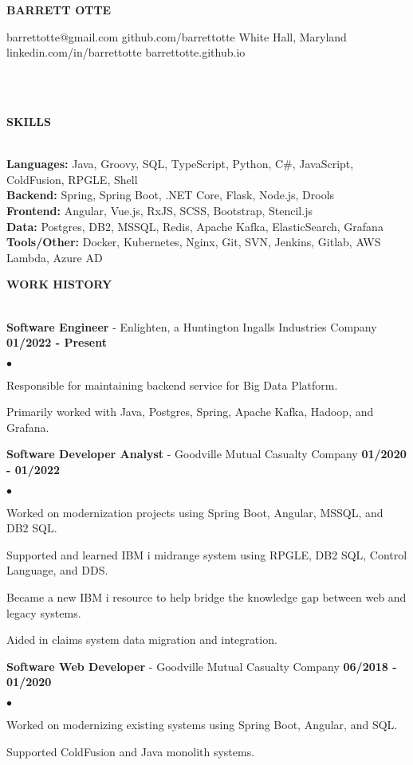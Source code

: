 \documentclass{article}
\newcommand{\lineunder}{
	\vspace*{-4pt}\\ 
	\hspace*{-18pt}\hrulefill \\
}
\newcommand{\header}[1]{
	{\hspace*{-15pt}\vspace*{6pt}\textsc{#1}}\vspace*{-6pt}\lineunder
}
\newcommand{\employer}[3]{
	\textbf{#1} - #2 \vspace*{2pt} \hfill \textbf{#3} \vspace*{2pt}
}
\newcommand{\contact}[6]{
	\begin{center}
		{\Large \textbf \scshape \bfseries{#1}}
	\end{center}
	\small{#2} \hfill \small{#3} \break
	\small{#4} \hfill \small{#5} \break
	\hspace*{20pt} \hfill \small {#6} \break
	\vspace*{-6pt}
	\lineunder
	\vspace*{-6pt}
}
\newenvironment{resumelist}{
	\vspace*{2pt}
	\begin{list}
		{\small$\bullet$}{\topsep 0pt \itemsep -2pt}}{\vspace*{4pt}
	\end{list}
}
\newcommand{\resumeheader}[1]{
	\vspace*{10pt}
	\header{\textbf{#1}}
    \vspace*{3pt}
}
\begin{document}
	\normalsize
	\smallskip
	\vspace*{-44pt}

	\contact
		{BARRETT OTTE}
		{barrettotte@gmail.com}
		{github.com/barrettotte}
		{White Hall, Maryland}
		{linkedin.com/in/barrettotte}
		{barrettotte.github.io}

	\resumeheader{SKILLS}
		\textbf{Languages:}
			Java, Groovy, SQL, TypeScript, Python, C\#, JavaScript, ColdFusion, RPGLE, Shell\\
			\vspace*{5pt}
        \textbf{Backend:}
			Spring, Spring Boot, .NET Core, Flask, Node.js, Drools\\
			\vspace*{5pt}
		\textbf{Frontend:}
			Angular, Vue.js, RxJS, SCSS, Bootstrap, Stencil.js\\
			\vspace*{5pt}
        \textbf{Data:}
			Postgres, DB2, MSSQL, Redis, Apache Kafka, ElasticSearch, Grafana\\
			\vspace*{5pt}
		\textbf{Tools/Other:}
			Docker, Kubernetes, Nginx, Git, SVN, Jenkins, Gitlab, AWS Lambda, Azure AD\\
			\vspace*{5pt}

	\resumeheader{WORK HISTORY}
		\employer
			{Software Engineer}{Enlighten, a Huntington Ingalls Industries Company}{01/2022 - Present}
			\begin{resumelist}
				\item Responsible for maintaining backend service for Big Data Platform.
				\item Primarily worked with Java, Postgres, Spring, Apache Kafka, Hadoop, and Grafana.
			\end{resumelist}
			\vspace*{6pt}
        \employer
			{Software Developer Analyst}{Goodville Mutual Casualty Company}{01/2020 - 01/2022}
			\begin{resumelist}
				\item Worked on modernization projects using Spring Boot, Angular, MSSQL, and DB2 SQL.
				\item Supported and learned IBM i midrange system using RPGLE, DB2 SQL, Control Language, and DDS.
				\item Became a new IBM i resource to help bridge the knowledge gap between web and legacy systems.
				\item Aided in claims system data migration and integration.
			\end{resumelist}
            \vspace*{6pt}
		\employer
			{Software Web Developer}{Goodville Mutual Casualty Company}{06/2018 - 01/2020}
			\begin{resumelist}
				\item Worked on modernizing existing systems using Spring Boot, Angular, and SQL.
				\item Supported ColdFusion and Java monolith systems.
			\end{resumelist}
\end{document}
